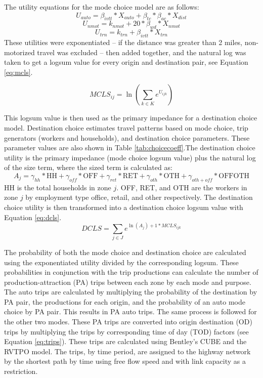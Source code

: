 \documentclass[fancy, masters,twoside]{byuthesis}
\begin{document}
The utility equations for the mode choice model are as follows:
\begin{equation}
U_{auto} = \beta_{ivtt} * X_{auto} + \beta_{tc} * \beta_{ac} * X_{dist}
\label{eq:driveutil}
\end{equation} \begin{equation}
U_{nmot} = k_{nmot} + 20 * \beta_{wd}*X_{nmot}
\label{eq:nonmoutil}
\end{equation} \begin{equation}
U_{trn} = k_{trn} + \beta_{ivtt} * X_{trn}
\label{eq:transutil}
\end{equation}
These utilities were exponentiated -- if the distance was greater than 2 miles, non-motorized travel was excluded -- then added together, and the natural log was taken to get a logsum value for every origin and destination pair, see Equation \eqref{eq:mcls}.

\begin{equation}
MCLS_{ij} = \ln(\sum_{k \in K} e^{U_{ijk}})
\label{eq:mcls}
\end{equation}

This logsum value is then used as the primary impedance for a destination choice model. Destination choice estimates travel patterns based on mode choice, trip generators (workers and households), and destination choice parameters. These parameter values are also shown in Table \ref{tab:choicecoeff}.The destination choice utility is the primary impedance (mode choice logsum value) plus the natural log of the size term, where the sized term is calculated as:
\begin{equation}
A_j = \gamma_{hh} * \mathrm{HH} + \gamma_{off} * \mathrm{OFF} + \gamma_{ret} * \mathrm{RET} + \gamma_{oth} * \mathrm{OTH} + \gamma_{oth+off} * \mathrm{OFFOTH}
\label{eq:dcsizeterm}
\end{equation}
HH is the total households in zone \(j\). OFF, RET, and OTH are the workers in zone \(j\) by employment type office, retail, and other respectively. The destination choice utility is then transformed into a destination choice logsum value with Equation \eqref{eq:dcls}.
\begin{equation}
DCLS = \sum_{j \in J} e^{\ln(A_j) + 1* MCLS_{ijk}}
\label{eq:dcls}
\end{equation}

The probability of both the mode choice and destination choice are calculated using the exponentiated utility divided by the corresponding logsum. These probabilities in conjunction with the trip productions can calculate the number of production-attraction (PA) trips between each zone by each mode and purpose. The auto trips are calculated by multiplying the probability of the destination by PA pair, the productions for each origin, and the probability of an auto mode choice by PA pair. This results in PA auto trips. The same process is followed for the other two modes. These PA trips are converted into origin destination (OD) trips by multiplying the trips by corresponding time of day (TOD) factors (see Equation \eqref{eq:trips}). These trips are calculated using Bentley's CUBE and the RVTPO model. The trips, by time period, are assigned to the highway network by the shortest path by time using free flow speed and with link capacity as a restriction.
\end{document}
